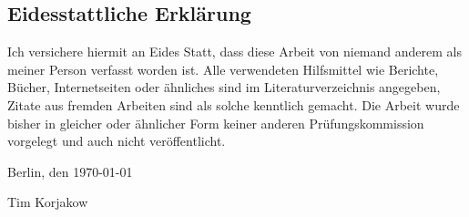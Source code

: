 %
\pagestyle{empty}

\subsection*{Eidesstattliche Erklärung}

Ich versichere hiermit an Eides Statt, dass diese Arbeit von niemand anderem als meiner Person verfasst worden ist. Alle verwendeten Hilfsmittel wie Berichte, Bücher, Internetseiten oder ähnliches sind im Literaturverzeichnis angegeben, Zitate aus fremden Arbeiten sind als solche kenntlich gemacht. Die Arbeit wurde bisher in gleicher oder ähnlicher Form keiner anderen Prüfungskommission vorgelegt und auch nicht veröffentlicht.
\par\bigskip  
\noindent Berlin, den \today

\vspace{1.2cm}

\noindent Tim Korjakow  

\cleardoublepage